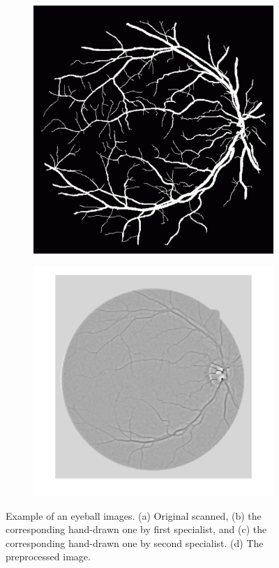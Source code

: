 \documentclass[12pt, notitlepage]{article}
\begin{document}
\begin{figure}[H]
\begin{subfigure}{0.4\columnwidth}
\caption{}
\label{fig:}
\end{subfigure}
\begin{subfigure}{0.4\columnwidth}
\includegraphics[width=\columnwidth]{figures/20_manual2}
\caption{}
\label{fig:}
\end{subfigure}
\begin{subfigure}{0.4\columnwidth}
\includegraphics[width=\columnwidth]{figures/preprocessed_20}
\caption{}
\label{fig:after_preprocess}
\end{subfigure}
\caption{Example of an eyeball images. (a) Original scanned, (b) the corresponding hand-drawn one by first specialist, and (c) the corresponding hand-drawn one by second specialist. (d) The preprocessed image.}
\label{fig:ex_eye_fig}
\end{figure}
  
\end{document}
